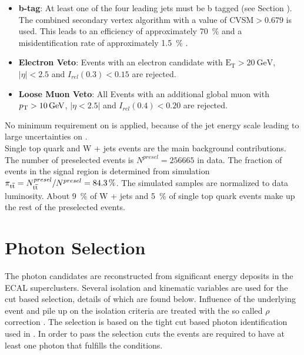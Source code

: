 \begin{itemize}
\item \textbf{b-tag}: At least one of the four leading jets must be b tagged (see Section ). The combined secondary vertex algorithm with a value of CVSM$> 0.679$ is used. This leads to an efficiency of approximately \SI{70}{\percent} and a misidentification rate of approximately \SI{1.5}{\percent} \cite{CMS-PAS-TOP-12-027} \cite{Chatrchyan:2012jua}.
\item \textbf{Electron Veto}: Events with an electron candidate with $\mathrm{E}_{\mathrm{T}} > \SI{20}{\giga \electronvolt}$, $| \eta |< 2.5$ and $I_{rel}(0.3)< 0.15$ are rejected.
\item \textbf{Loose Muon Veto}: All Events with an additional global muon with $p_{\mathrm{T}} > \SI{10}{\giga \electronvolt}$, $|\eta < 2.5|$ and $I_{rel}(0.4)<0.20$ are rejected. 
\end{itemize}

No minimum requirement on \ETm is applied, because of the jet energy scale leading to large uncertainties on \ETm .\\
Single top quark and W + jets events are the main background contributions. The number of preselected events is $N^{presel} =256665$ in data. The fraction of \ttbar events in the \ttgamma signal region is determined from simulation $\pi_{\mathrm{t}\overline{\mathrm{t}}} = N^{presel}_{\mathrm{t}\overline{\mathrm{t}}} / N^{presel} = \SI{84.3}{\percent}$. The simulated samples are normalized to data luminosity. About \SI{9}{\percent} of W + jets and \SI{5}{\percent} of single top quark events make up the rest of the preselected events.\\

\section{Photon Selection}

The photon candidates are reconstructed from significant energy deposits in the ECAL superclusters. Several isolation and kinematic variables are used for the cut based selection, details of which are found below. Influence of the underlying event and pile up on the isolation criteria are treated with the so called $\rho$ correction \cite{CMS-PAS-PFT-09-001}. The selection is based on the tight cut based photon identification used in \cite{CMS-PAS-HIG-13-006}. In order to pass the selection cuts the events are required to have at least one photon that fulfills the conditions.

